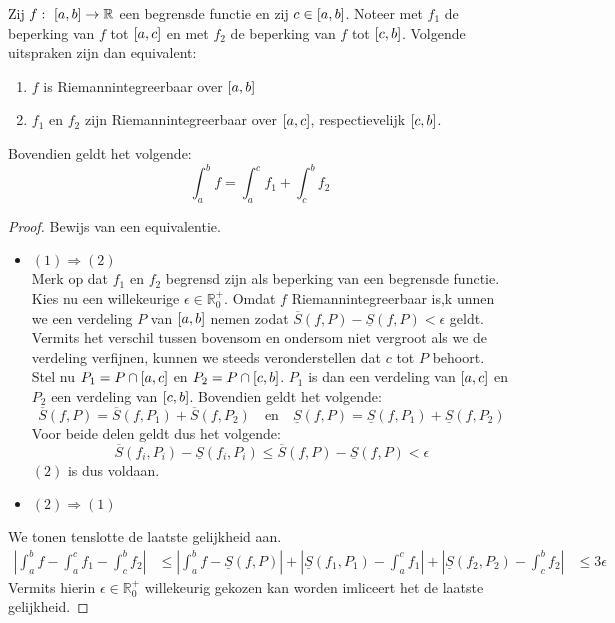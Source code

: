 \documentclass[main.tex]{subfiles}
\begin{document}
\begin{bpr}
  Zij $f:\ \interval{a}{b} \rightarrow \mathbb{R}$ een begrensde functie en zij $c\in \interval{a}{b}$.
  Noteer met $f_{1}$ de beperking van $f$ tot $\interval{a}{c}$ en met $f_{2}$ de beperking van $f$ tot $\interval{c}{b}$.
  Volgende uitspraken zijn dan equivalent:
  \begin{enumerate}
  \item $f$ is Riemannintegreerbaar over $\interval{a}{b}$
  \item $f_{1}$ en $f_{2}$ zijn Riemannintegreerbaar over $\interval{a}{c}$, respectievelijk $\interval{c}{b}$.
  \end{enumerate}
  Bovendien geldt het volgende:
  \[ \int_{a}^{b}f = \int_{a}^{c}f_{1} + \int_{c}^{b}f_{2} \]

  \begin{proof}
    Bewijs van een equivalentie.
    \begin{itemize}
    \item $(1)\Rightarrow (2)$\\
      Merk op dat $f_{1}$ en $f_{2}$ begrensd zijn als beperking van een begrensde functie.
      Kies nu een willekeurige $\epsilon\in\mathbb{R}_{0}^{+}$. Omdat $f$ Riemannintegreerbaar is,k unnen we een verdeling $P$ van $\interval{a}{b}$ nemen zodat $\overline{S}(f,P) - \underline{S}(f,P) < \epsilon$ geldt.
      Vermits het verschil tussen bovensom en ondersom niet vergroot als we de verdeling verfijnen, kunnen we steeds veronderstellen dat $c$ tot $P$ behoort.
      Stel nu $P_{1} = P \cap \interval{a}{c}$ en $P_{2} = P \cap \interval{c}{b}$.
      $P_{1}$ is dan een verdeling van $\interval{a}{c}$ en $P_{2}$ een verdeling van $\interval{c}{b}$.
      Bovendien geldt het volgende:
      \[ \overline{S}(f,P) = \overline{S}(f,P_{1}) + \overline{S}(f,P_{2}) \quad\text{en}\quad \underline{S}(f,P) = \underline{S}(f,P_{1}) + \underline{S}(f,P_{2})\]
      Voor beide delen geldt dus het volgende:
      \[ \overline{S}(f_{i},P_{i}) - \underline{S}(f_{i},P_{i}) \le \overline{S}(f,P) - \underline{S}(f,P) < \epsilon \]
      $(2)$ is dus voldaan.
    \item $(2)\Rightarrow (1)$\\
    \end{itemize}
    We tonen tenslotte de laatste gelijkheid aan.
    \begin{align*}
      \left| \int_{a}^{b}f - \int_{a}^{c}f_{1} - \int_{c}^{b}f_{2} \right|
      &\le \left| \int_{a}^{b}f - \underline{S}(f,P) \right| + \left|\underline{S}(f_{1},P_{1})- \int_{a}^{c}f_{1}\right| + \left|\underline{S}(f_{2},P_{2}) - \int_{c}^{b}f_{2} \right|
      &\le 3 \epsilon
    \end{align*}
    Vermits hierin $\epsilon \in \mathbb{R}_{0}^{+}$ willekeurig gekozen kan worden imliceert het de laatste gelijkheid.
  \end{proof}
\end{bpr}
\end{document}
